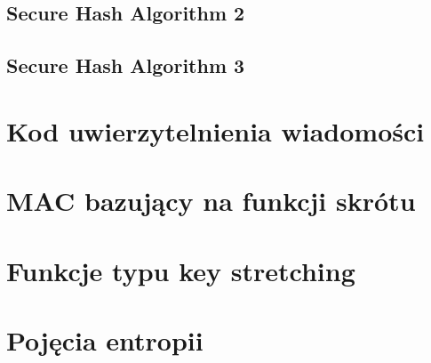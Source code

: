 \subsection{Secure Hash Algorithm 2}
\subsection{Secure Hash Algorithm 3}


\section{Kod uwierzytelnienia wiadomości}
\section{MAC bazujący na funkcji skrótu}
\section{Funkcje typu key stretching}
\section{Pojęcia entropii}
